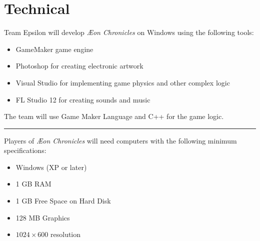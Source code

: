 \documentclass[12pt,titlepage]{article}
\newcommand\gametitle{\textit{\AE on Chronicles}\xspace}
\newcommand\sep{\rule{2.5in}{0.1mm}}
\begin{document}




\newpage
\section{Technical}
%

Team Epsilon will develop \gametitle on Windows using the following tools:

\begin{itemize}
    \item GameMaker game engine
    \item Photoshop for creating electronic artwork
    \item Visual Studio for implementing game physics and other complex logic
    \item FL Studio 12 for creating sounds and music
\end{itemize}

The team will use Game Maker Language and C++ for the game logic.

\sep

Players of \gametitle will need computers with the following minimum
specifications:

\begin{itemize}
    \item Windows (XP or later)
    \item 1 GB RAM
    \item 1 GB Free Space on Hard Disk
    \item 128 MB Graphics
    \item $1024 \times 600$ resolution
\end{itemize}
\end{document}
